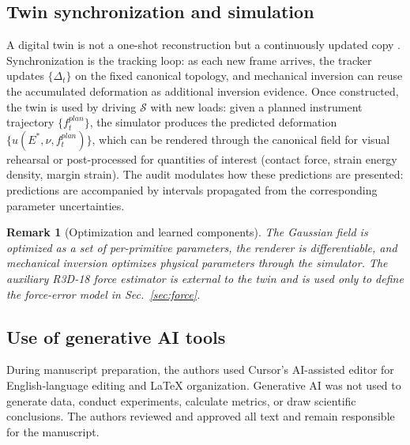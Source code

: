 \documentclass[pdflatex,lineno,referee,sn-vancouver,Numbered]{sn-jnl}
\newtheorem{remark}{Remark}
\begin{document}
\subsection{Twin synchronization and simulation}
\label{sec:sync}
A digital twin is not a one-shot reconstruction but a continuously updated
copy \cite{landig2025}. Synchronization is the tracking loop: as each new
frame arrives, the tracker updates $\{\Delta_t\}$ on the fixed canonical
topology, and mechanical inversion can reuse the accumulated deformation as
additional inversion evidence.
Once constructed, the twin is used by driving $\mathcal{S}$ with new loads:
given a planned instrument trajectory $\{f_t^{plan}\}$, the simulator
produces the predicted deformation $\{u(E^*, \nu, f_t^{plan})\}$, which can
be rendered through the canonical field for visual rehearsal or post-processed
for quantities of interest (contact force, strain energy density, margin
strain). The audit modulates how these predictions are presented:
predictions are accompanied by intervals propagated from the corresponding
parameter uncertainties.

\begin{remark}[Optimization and learned components]
\label{rem:networkfree}
The Gaussian field is optimized as a set of per-primitive parameters, the
renderer is differentiable, and mechanical inversion optimizes physical
parameters through the simulator. The auxiliary R3D-18 force estimator is
external to the twin and is used only to define the force-error model in
Sec.~\ref{sec:force}.
\end{remark}

\subsection{Use of generative AI tools}
During manuscript preparation, the authors used Cursor's AI-assisted
editor for English-language editing and LaTeX organization. Generative AI
was not used to generate data, conduct experiments, calculate metrics, or
draw scientific conclusions. The authors reviewed and approved all text
and remain responsible for the manuscript.

\end{document}
